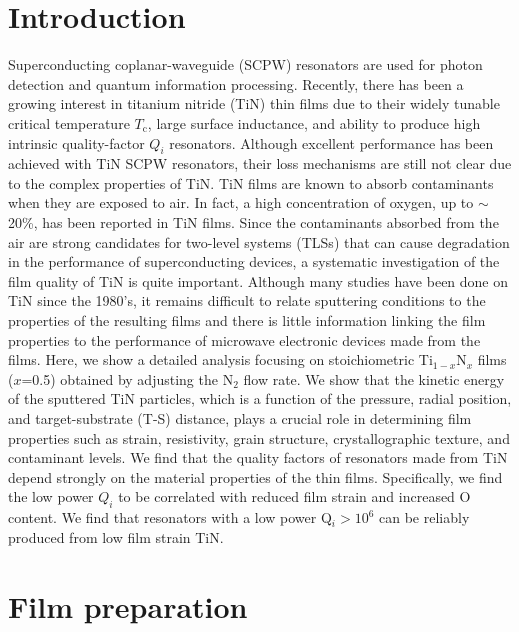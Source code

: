 \section{Introduction}
Superconducting coplanar-waveguide (SCPW) resonators are used for photon detection and quantum information processing. Recently, there has been a growing interest in titanium nitride (TiN) thin films due to their widely tunable critical temperature $T_{\text{c}}$, large surface inductance, and ability to produce high intrinsic quality-factor $Q_{i}$ resonators.\cite{Leduc2010, Vissers2010, Sage2011, Vissers2012, Diener2012, Mazin2012, Cecil2012, Noroozian2012, Calvo2012, Eom2012, Krockenberger2012, Driessen2012} Although excellent performance has been achieved with TiN SCPW resonators, their loss mechanisms are still not clear due to the complex properties of TiN.  TiN films are known to absorb contaminants when they are exposed to air.\cite{Kumar1988, Mandl1990,Logothetidis1999} In fact, a high concentration of oxygen, up to $\sim$20\%, has been reported in TiN films.\cite{Chowdhury1996, Chappe2007, Radecka2011} Since the contaminants absorbed from the air are strong candidates for two-level systems (TLSs) that can cause degradation in the performance of superconducting devices\cite{Martinis2005}, a systematic investigation of the film quality of TiN is quite important. Although many studies have been done on TiN since the 1980's, it remains difficult to relate sputtering conditions to the properties of the resulting films and there is little information linking the film properties to the performance of microwave electronic devices made from the films. Here, we show a detailed analysis focusing on stoichiometric Ti$_{1-x}$N$_{x}$ films ($x$=0.5) obtained by adjusting the N$_{2}$ flow rate.  We show that the kinetic energy of the sputtered TiN particles, which is a function of the pressure, radial position, and target-substrate (T-S) distance, plays a crucial role in determining film properties such as strain, resistivity, grain structure, crystallographic texture, and contaminant levels.  We find that the quality factors of resonators made from TiN depend strongly on the material properties of the thin films.  Specifically, we find the low power $Q_{i}$ to be correlated with reduced film strain and increased O content.  We find that resonators with a low power Q$_{i} > 10^{6}$ can be reliably produced from low film strain TiN.

\section{Film preparation}

